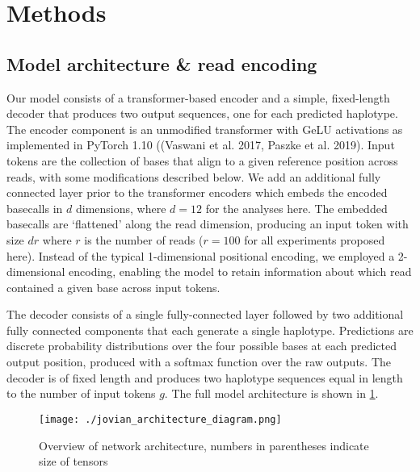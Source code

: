 \documentclass[]{article}
\begin{document}
\section{Methods}

\subsection{Model architecture \& read encoding}

Our model consists of a transformer-based encoder and a simple, fixed-length decoder that produces two output sequences, one for each predicted haplotype. The encoder component is an unmodified transformer with GeLU activations as implemented in PyTorch 1.10 ((Vaswani et al. 2017, Paszke et al. 2019). Input tokens are the collection of bases that align to a given reference position across reads, with some modifications described below. We add an additional fully connected layer prior to the transformer encoders which embeds the encoded basecalls in $d$ dimensions, where $d=12$ for the analyses here. The embedded basecalls are `flattened' along the read dimension, producing an input token with size $dr$ where $r$ is the number of reads ($r=100$ for all experiments proposed here).  Instead of the typical 1-dimensional positional encoding, we employed a 2-dimensional encoding, enabling the model to retain information about which read contained a given base across input tokens. 

The decoder consists of a single fully-connected layer followed by two additional fully connected components that each generate a single haplotype. Predictions are discrete probability distributions over the four possible bases at each predicted output position, produced with a softmax function over the raw outputs. The decoder is of fixed length and produces two haplotype sequences equal in length to the number of input tokens $g$. The full model architecture is shown in \ref{fig:architecture}. 


\begin{figure}[htp]
	\texttt{[image: ./jovian\_architecture\_diagram.png]}
	\caption{ Overview of network architecture, numbers in parentheses indicate size of tensors  }
	\label{fig:architecture}
\end{figure}
\end{document}
